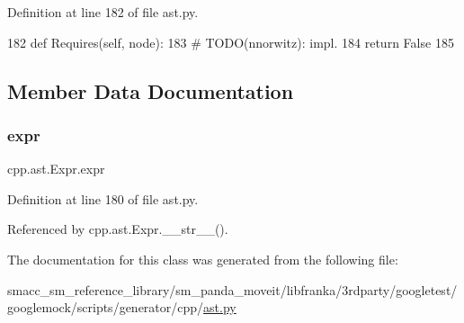 Definition at line 182 of file ast.\+py.


\begin{DoxyCode}
182     \textcolor{keyword}{def }Requires(self, node):
183         \textcolor{comment}{# TODO(nnorwitz): impl.}
184         \textcolor{keywordflow}{return} \textcolor{keyword}{False}
185 
\end{DoxyCode}


\subsection{Member Data Documentation}
\mbox{\label{classcpp_1_1ast_1_1Expr_a2f4e13fb0176f2616f8703103c806462}} 
\subsubsection{\texorpdfstring{expr}{expr}}
{\footnotesize\ttfamily cpp.\+ast.\+Expr.\+expr}



Definition at line 180 of file ast.\+py.



Referenced by cpp.\+ast.\+Expr.\+\_\+\+\_\+str\+\_\+\+\_\+().



The documentation for this class was generated from the following file\+:\begin{DoxyCompactItemize}
\item 
smacc\+\_\+sm\+\_\+reference\+\_\+library/sm\+\_\+panda\+\_\+moveit/libfranka/3rdparty/googletest/googlemock/scripts/generator/cpp/\hyperlink{ast_8py}{ast.\+py}\end{DoxyCompactItemize}
